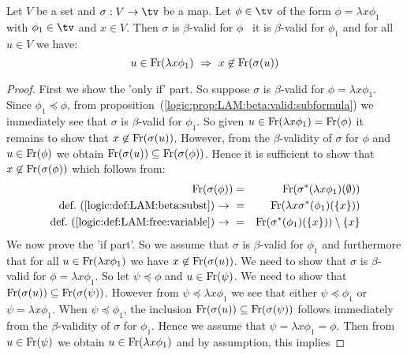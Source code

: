 \begin{prop}\label{logic:prop:LAM:beta:valid:recursion:lam:2}
    Let $V$ be a set and $\sigma:V\to\tv$ be a map. Let $\phi\in\tv$ 
    of the form $\phi=\lambda x\phi_{1}$ with $\phi_{1}\in\tv$ and $x\in V$. 
    Then $\sigma$ is $\beta$-valid for $\phi$ \ifand\ it is $\beta$-valid 
    for $\phi_{1}$ and for all $u\in V$ we have:
    \[
        u\in\free(\lambda x\phi_{1})\ \Rightarrow\ x\not\in\free(\sigma(u))
    \]
\end{prop}
\begin{proof}
    First we show the 'only if' part. So suppose $\sigma$ is $\beta$-valid
    for $\phi=\lambda x\phi_{1}$. Since $\phi_{1}\preceq\phi$, from
    proposition~(\ref{logic:prop:LAM:beta:valid:subformula}) we immediately
    see that $\sigma$ is $\beta$-valid for $\phi_{1}$. So given
    $u\in\mbox{\rm Fr}(\lambda x \phi_{1})=\mbox{\rm Fr}(\phi)$ it remains to show that
    $x\not\in\mbox{\rm Fr}(\sigma(u))$. However, from the $\beta$-validity of 
    $\sigma$ for $\phi$ and $u\in\mbox{\rm Fr}(\phi)$ we obtain
    $\mbox{\rm Fr}(\sigma(u))\subseteq\mbox{\rm Fr}(\sigma(\phi))$. Hence it is sufficient
    to show that $x\not\in\mbox{\rm Fr}(\sigma(\phi))$ which follows from:
    \begin{eqnarray*}
        \mbox{\rm Fr}(\sigma(\phi))
        &=&\mbox{\rm Fr}(\sigma^{*}(\lambda x\phi_{1})(\emptyset))\\
        \mbox{def.~(\ref{logic:def:LAM:beta:subst})$\ \rightarrow\ $}
        &=&\mbox{\rm Fr}(\lambda x \sigma^{*}(\phi_{1})(\{x\}))\\
        \mbox{def.~(\ref{logic:def:LAM:free:variable})$\ \rightarrow\ $}
        &=&\mbox{\rm Fr}(\sigma^{*}(\phi_{1})(\{x\}))\setminus\{x\}
    \end{eqnarray*}
    We now prove the 'if part'. So we assume that $\sigma$ is $\beta$-valid
    for $\phi_{1}$ and furthermore that for all $u\in\mbox{\rm Fr}(\lambda x\phi_{1})$
    we have $x\not\in\mbox{\rm Fr}(\sigma(u))$. We need to show that $\sigma$ is 
    $\beta$-valid for $\phi=\lambda x\phi_{1}$. So let $\psi\preceq\phi$ and 
    $u\in\mbox{\rm Fr}(\psi)$. We need to show that 
    $\mbox{\rm Fr}(\sigma(u))\subseteq\mbox{\rm Fr}(\sigma(\psi))$. However from 
    $\psi\preceq\lambda x\phi_{1}$ we see that either $\psi\preceq\phi_{1}$
    or $\psi=\lambda x\phi_{1}$. When $\psi\preceq\phi_{1}$, the inclusion
    $\mbox{\rm Fr}(\sigma(u))\subseteq\mbox{\rm Fr}(\sigma(\psi))$ follows immediately
    from the $\beta$-validity of $\sigma$ for $\phi_{1}$. Hence we assume 
    that $\psi=\lambda x\phi_{1}=\phi$. Then from $u\in\mbox{\rm Fr}(\psi)$ we
    obtain $u\in\mbox{\rm Fr}(\lambda x\phi_{1})$ and by assumption, this implies

\end{proof}
